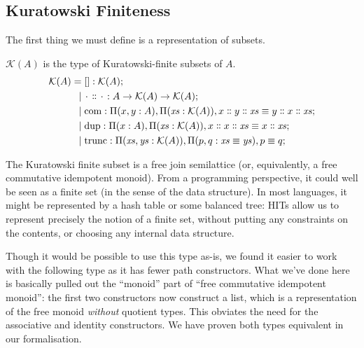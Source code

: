 \subsection{Kuratowski Finiteness}
The first thing we must define is a representation of subsets.
\begin{rm-definition}
  \(\mathcal{K}(A)\) is the type of Kuratowski-finite subsets of \(A\).
  \begin{equation}
    \begin{aligned}
      \mathcal{K}(A) =&
      \; [] : \mathcal{K}(A) ; \\
      \vert& \; \wc \dblcolon \wc : A \rightarrow \mathcal{K}(A) \rightarrow \mathcal{K}(A) ; \\
      \vert& \; \text{com} : \Pi (x, y: A) , \Pi (\mathit{xs} : \mathcal{K}(A)) , x \dblcolon y \dblcolon \mathit{xs} \equiv y \dblcolon x \dblcolon \mathit{xs} ; \\
      \vert& \; \text{dup} : \Pi (x : A) , \Pi (\mathit{xs} : \mathcal{K}(A)) , x \dblcolon x \dblcolon \mathit{xs} \equiv x \dblcolon \mathit{xs} ; \\
      \vert& \; \text{trunc} : \Pi (\mathit{xs}, \mathit{ys}: \mathcal{K}(A)) , \Pi (p, q : \mathit{xs} \equiv \mathit{ys}) , p \equiv q ;
    \end{aligned}
  \end{equation}
\end{rm-definition}
The Kuratowski finite subset is a free join semilattice (or, equivalently, a
free commutative idempotent monoid).
From a programming perspective, it could well be seen as a finite set (in the
sense of the data structure).
In most languages, it might be represented by a hash table or some balanced
tree: HITs allow us to represent precisely the notion of a finite set, without
putting any constraints on the contents, or choosing any internal data
structure.

Though it would be possible to use this type as-is, we found it easier to work
with the following type as it has fewer path constructors.
What we've done here is basically pulled out the ``monoid'' part of ``free
commutative idempotent monoid'': the first two constructors now construct a
list, which is a representation of the free monoid \emph{without} quotient
types.
This obviates the need for the associative and identity constructors.
We have proven both types equivalent in our formalisation.

